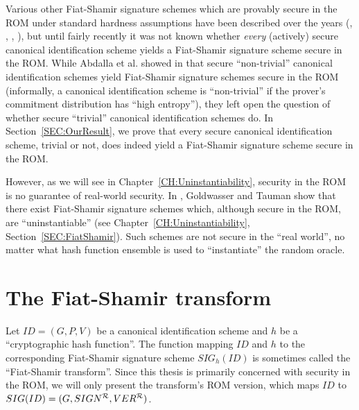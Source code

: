 Various other Fiat-Shamir signature schemes which are provably secure in the
ROM under standard hardness assumptions have been described over the years
(\cite{micali:betterfs}, \cite{okamoto:discretelogfs}, \cite{shoup:practid},
\cite{goh:romcdh}), but until fairly recently it was not known whether {\it
every} (actively) secure canonical identification scheme yields a Fiat-Shamir
signature scheme secure in the ROM. While Abdalla et al. showed in
\cite{abdalla:fiatshamirrom} that secure ``non-trivial'' canonical
identification schemes yield Fiat-Shamir signature schemes secure in the ROM
(informally, a canonical identification scheme is ``non-trivial'' if the
prover's commitment distribution has ``high entropy''), they left open the
question of whether secure ``trivial'' canonical identification schemes do. In
Section~\ref{SEC:OurResult}, we prove that every secure canonical
identification scheme, trivial or not, does indeed yield a Fiat-Shamir
signature scheme secure in the ROM.

However, as we will see in Chapter~\ref{CH:Uninstantiability}, security in the
ROM is no guarantee of real-world security. In
\cite{goldwasser:fsparadigmfails}, Goldwasser and Tauman show that there exist
Fiat-Shamir signature schemes which, although secure in the ROM, are
``uninstantiable'' (see Chapter~\ref{CH:Uninstantiability},
Section~\ref{SEC:FiatShamir}). Such schemes are not secure in the ``real
world'', no matter what hash function ensemble is used to ``instantiate'' the
random oracle.
%

\section{The Fiat-Shamir transform}
\label{SEC:FiatShamirTransform}
Let $ID = (G,P,V)$ be a canonical identification scheme and $h$ be a
``cryptographic hash function''. The function mapping $ID$ and $h$ to the
corresponding Fiat-Shamir signature scheme $SIG_h(ID)$ is sometimes called the
``Fiat-Shamir transform''. Since this thesis is primarily concerned with
security in the ROM, 
we will only present the transform's ROM version,
which maps $ID$ to $SIG(ID) = (G,SIGN^{\mathcal{R}},VER^{\mathcal{R}})$.

